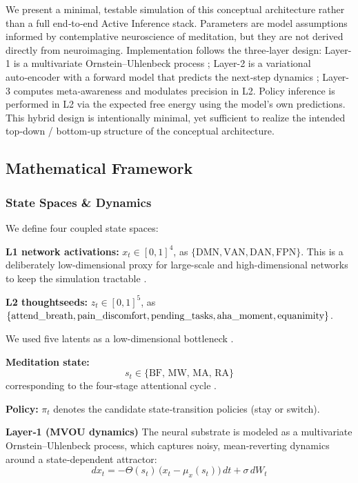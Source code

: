 \documentclass[openacc]{rsproca_new}%
\begin{document}
We present a minimal, testable simulation of this conceptual architecture rather than a full end‑to‑end Active Inference stack. Parameters are model assumptions informed by contemplative neuroscience of meditation, but they are not derived directly from neuroimaging. Implementation follows the three‑layer design: Layer-1 is a multivariate Ornstein–Uhlenbeck process \cite{Gilson2016}; Layer-2 is a variational auto‑encoder with a forward model that predicts the next‑step dynamics \cite{KingmaWelling2013}; Layer-3 computes meta‑awareness and modulates precision in L2. Policy inference is performed in L2 via the expected free energy using the model’s own predictions. This hybrid design is intentionally minimal, yet sufficient to realize the intended top‑down / bottom‑up structure of the conceptual architecture. 
 
\subsection{Mathematical Framework}

\subsubsection{State Spaces \& Dynamics}

We define four coupled state spaces:

\textbf{L1 network activations:} \( x_t \in [0,1]^4 \), as \(\{ \text{DMN}, \text{VAN}, \text{DAN}, \text{FPN} \}\). This is a deliberately low-dimensional proxy for large-scale and high-dimensional networks to keep the simulation tractable \cite{Yeo2011}.

\textbf{L2 thoughtseeds:} \( z_t \in [0,1]^5 \), as 
\(\{ \text{attend\_breath}, \text{pain\_discomfort},  \text{pending\_tasks}, \text{aha\_moment}, \\ \text{equanimity} \}\).

We used five latents as a low-dimensional bottleneck \cite{Miller1956,Bengio2017}.

\textbf{Meditation state:} \[s_t \in \{\mathrm{BF},\, \mathrm{MW},\, \mathrm{MA},\, \mathrm{RA}\}
\]
corresponding to the four‑stage attentional cycle \cite{Hasenkamp2012}.

\textbf{Policy: }\( \pi_t \) denotes the candidate state‑transition policies (stay or switch).

\vspace{1em}
\textbf{Layer‑1 (MVOU dynamics)} 
The neural substrate is modeled as a multivariate Ornstein–Uhlenbeck process, which captures noisy, mean‑reverting dynamics around a state‑dependent attractor:
\[
dx_t = -\Theta(s_t)\,\bigl(x_t - \mu_x(s_t)\bigr)\,dt + \sigma\, dW_t \tag{1}
\]
\end{document}
